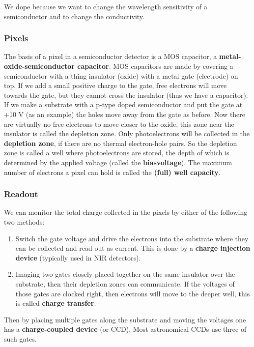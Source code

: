 \documentclass[a4paper]{article}
\begin{document}
We dope because we want to change the wavelength sensitivity of a semiconductor and to change the conductivity.

\subsubsection*{Pixels}

The basis of a pixel in a semiconductor detector is a MOS capacitor, a \textbf{metal-oxide-semiconductor capacitor}. MOS capacitors are made by covering a semiconductor with a thing insulator (oxide) with a metal gate (electrode) on
top. If we add a small positive charge to the gate, free electrons will move towards the gate, but they cannot cross the insulator (thus we have a capacitor). If we make a substrate with a p-type doped semiconductor and put the gate at +10 V (as an example) the holes move away from the gate as before. Now there are virtually no free electrons to move closer to the oxide, this zone near the insulator is called the depletion zone. Only photoelectrons will be collected in the \textbf{depletion zone}, if there are no thermal electron-hole pairs. So the depletion zone is called a well where photoelectrons are stored, the depth of which is determined by the applied voltage (called the \textbf{biasvoltage}). The maximum number of electrons a pixel can hold is called the \textbf{(full) well capacity}.

\subsubsection*{Readout}

We can monitor the total charge collected in the pixels by either of the following two methods:

\begin{enumerate}
    \item Switch the gate voltage and drive the electrons into the substrate where they can be collected and read out as current. This is done by a \textbf{charge injection device} (typically used in NIR detectors).
    \item Imaging two gates closely placed together on the same insulator over the substrate, then their depletion zones can communicate. If the voltages of those gates are clocked right, then electrons will move to the deeper well, this is called \textbf{charge transfer}.
\end{enumerate}

Then by placing multiple gates along the substrate and moving the voltages one has a \textbf{charge-coupled device} (or CCD). Most astronomical CCDs use three of such gates.
\end{document}
